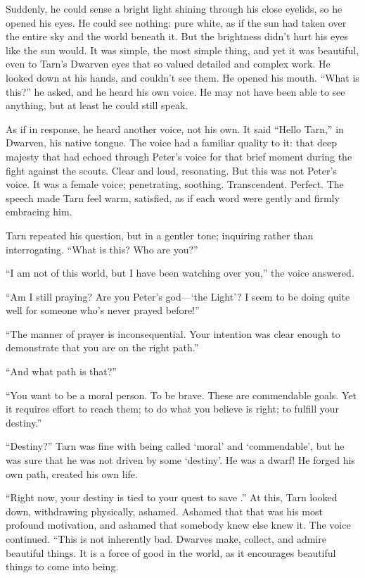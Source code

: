 Suddenly, he could sense a bright light shining through his close eyelids, so he opened his eyes.  He could see nothing: pure white, as if the sun had taken over the entire sky and the world beneath it.  But the brightness didn't hurt his eyes like the sun would.  It was simple, the most simple thing, and yet it was beautiful, even to Tarn's Dwarven eyes that so valued detailed and complex work.  He looked down at his hands, and couldn't see them.  He opened his mouth.  ``What is this?'' he asked, and he heard his own voice.  He may not have been able to see anything, but at least he could still speak.

As if in response, he heard another voice, not his own.  It said ``Hello Tarn,''  in Dwarven, his native tongue.  The voice had a familiar quality to it: that deep majesty that had echoed through Peter's voice for that brief moment during the fight against the scouts.  Clear and loud, resonating.  But this was not Peter's voice.  It was a female voice; penetrating, soothing.  Transcendent.  Perfect.  The speech made Tarn feel warm, satisfied, as if each word were gently and firmly embracing him.

Tarn repeated his question, but in a gentler tone; inquiring rather than interrogating.  ``What is this?  Who are you?''

``I am not of this world, but I have been watching over you,'' the voice answered.

``Am I still praying?  Are you Peter's god---`the Light'?  I seem to be doing quite well for someone who's never prayed before!''

``The manner of prayer is inconsequential.  Your intention was clear enough to demonstrate that you are on the right path.''

``And what path is that?''

``You want to be a moral person.  To be brave.  These are commendable goals.  Yet it requires effort to reach them; to do what you believe is right; to fulfill your destiny.''

``Destiny?'' Tarn was fine with being called `moral' and `commendable', but he was sure that he was not driven by some `destiny'.  He was a dwarf!  He forged his own path, created his own life.

``Right now, your destiny is tied to your quest to save \kildir.''  At this, Tarn looked down, withdrawing physically, ashamed.  Ashamed that that was his most profound motivation, and ashamed that somebody knew else knew it.  The voice continued. ``This is not inherently bad.  Dwarves make, collect, and admire beautiful things.  It is a force of good in the world, as it encourages beautiful things to come into being.

